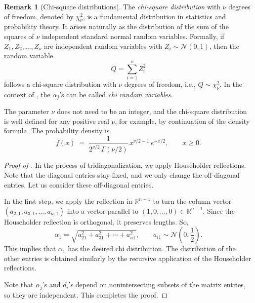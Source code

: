 \documentclass[letterpaper,11pt,oneside,reqno]{article}
\numberwithin{equation}{section}
\theoremstyle{definition}
\newtheorem{remark}[proposition]{Remark}
\begin{document}
\begin{remark}[Chi-square distributions]
The \emph{chi-square distribution} with \(\nu\) degrees of
freedom, denoted by \(\chi^2_{\nu}\), is a fundamental
distribution in statistics and probability theory. It arises
naturally as the distribution of the sum of the squares of
\(\nu\) independent standard normal random variables.
Formally, if \(Z_1, Z_2, \ldots, Z_{\nu}\) are independent
random variables with \(Z_i \sim \mathcal{N}(0,1)\), then
the random variable
\[
  Q = \sum_{i=1}^{\nu} Z_i^2
\]
follows a chi-square distribution with \(\nu\) degrees of
freedom, i.e., \(Q \sim \chi^2_{\nu}\). In the context of
, the $\alpha_j$'s can be called \emph{chi random variables}.

The parameter $\nu$ does not need to be an integer, and the
chi-square distribution is well defined for any positive
real $\nu$, for example, by continuation of the density formula.
The probability density is
\begin{equation*}
	f(x) \;=\; \frac{1}{2^{\nu/2}\,\Gamma(\nu/2)}\,x^{\nu/2-1}\,e^{-x/2},
	\qquad x\ge 0.
\end{equation*}
\end{remark}

\begin{proof}[Proof of ]
	In the process of tridiagonalization,
	we apply Householder reflections.
	Note that the diagonal entries stay fixed,
	and we only change the off-diagonal entries.
	Let us consider these off-diagonal entries.

	In the first step, we apply the reflection in $\mathbb{R}^{n-1}$
	to turn the column vector $(a_{2,1},a_{3,1},\ldots,a_{n,1} )$ into
	a vector parallel to $(1,0,\ldots,0)\in \mathbb{R}^{n-1}$.
	Since the Householder reflection is orthogonal,
	it preserves lengths. So,
	\begin{equation*}
		\alpha_1=\sqrt{a_{21}^2+a_{31}^2+\cdots+a_{n1}^2},\qquad a_{i1}\sim
		\mathcal{N}(0,\dfrac{1}{2}).
	\end{equation*}
	This implies that $\alpha_1$ has the desired chi distribution.
	The distribution of the other entries is obtained similarly by the recursive
	application of the Householder reflections.

	Note that $\alpha_j$'s and $d_i$'s depend on nonintersecting
	subsets of the matrix entries, so they are independent. This completes the proof.
\end{proof}
\end{document}
